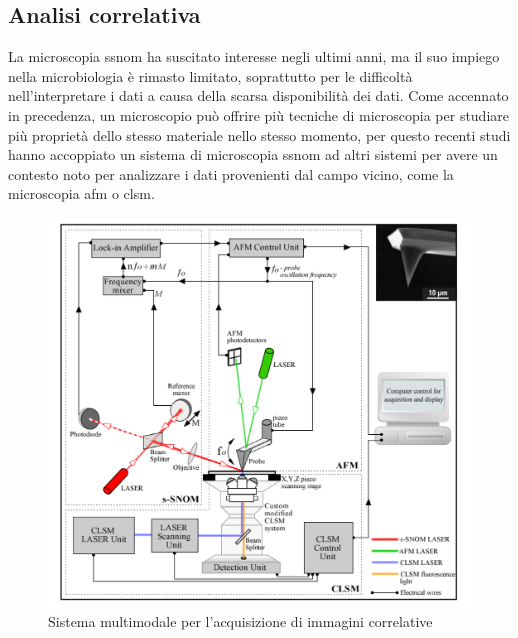 \documentclass[../main.tex]{subfiles}
\begin{document}
\subsection{Analisi correlativa}
La microscopia \acrshort{ssnom} ha suscitato interesse negli ultimi anni, ma il suo impiego nella \gls{microbiologia} è rimasto limitato, soprattutto per le difficoltà nell'interpretare i dati a causa della scarsa disponibilità dei dati. Come accennato in precedenza, un microscopio può offrire più tecniche di microscopia per studiare più proprietà dello stesso materiale nello stesso momento, per questo recenti studi hanno accoppiato un sistema di microscopia \acrshort{ssnom} ad altri sistemi per avere un contesto noto per analizzare i dati provenienti dal campo vicino, come la microscopia \acrfull{afm} o \acrshort{clsm}.\cite{stanciu_2017}

\begin{figure}[h]
\centering
\includegraphics[keepaspectratio, height=\linewidth]{images/multimodal_system.jpg}
\caption[Sistema multimodale per l'acquisizione di immagini correlative]{
	Sistema multimodale per l'acquisizione di immagini correlative \cite{stanciu_2017}}
\label{fig:multimodal_system}
\end{figure}
\end{document}
